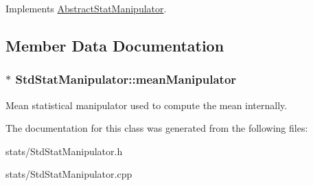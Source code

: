 Implements \hyperlink{class_abstract_stat_manipulator_a8ae1dd190a2c85ff4e219a48f92763b7}{Abstract\+Stat\+Manipulator}.



\subsection{Member Data Documentation}
\subsubsection[{\texorpdfstring{mean\+Manipulator}{meanManipulator}}]{$\ast$ Std\+Stat\+Manipulator\+::mean\+Manipulator\hspace{0.3cm}{\ttfamily [private]}}\hypertarget{class_std_stat_manipulator_aa14f0467d5a1ce40bfd78b3d39db54a1}{}\label{class_std_stat_manipulator_aa14f0467d5a1ce40bfd78b3d39db54a1}
Mean statistical manipulator used to compute the mean internally. 

The documentation for this class was generated from the following files\+:\begin{DoxyCompactItemize}
\item 
stats/Std\+Stat\+Manipulator.\+h\item 
stats/Std\+Stat\+Manipulator.\+cpp\end{DoxyCompactItemize}
